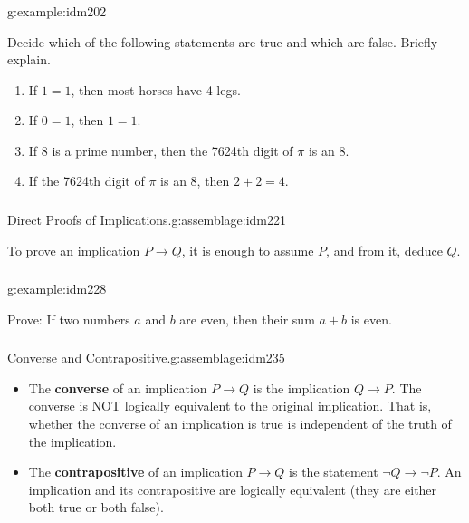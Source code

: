 \documentclass[11pt, compress]{beamer}
\newcommand{\terminology}[1]{\textbf{#1}}\newcommand{\lt}{<}
\newcommand{\imp}{\rightarrow}
\begin{document}
\begin{frame}
\frametitle{}
\begin{example}{}{g:example:idm202}%

Decide which of the following statements are true and which are false. Briefly explain.\begin{enumerate}
\item{}
If \(1=1\), then most horses have 4 legs.

\item{}
If \(0=1\), then \(1=1\).

\item{}
If 8 is a prime number, then the 7624th digit of \(\pi\) is an 8.

\item{}
If the 7624th digit of \(\pi\) is an 8, then \(2+2 = 4\).
\end{enumerate}\end{example}
\end{frame}
 
\begin{frame}
\frametitle{}
\begin{assemblage}{Direct Proofs of Implications.}{g:assemblage:idm221}%

To prove an implication \(P \imp Q\), it is enough to assume \(P\), and from it, deduce \(Q\).\end{assemblage}
\end{frame}
 
\begin{frame}
\frametitle{}
\begin{example}{}{g:example:idm228}%

Prove: If two numbers \(a\) and \(b\) are even, then their sum \(a+b\) is even.\end{example}
\end{frame}
 
\begin{frame}
\frametitle{}
\begin{assemblage}{Converse and Contrapositive.}{g:assemblage:idm235}%

\begin{itemize}
\item{}
The \terminology{converse}  of an implication \(P \imp Q\) is the implication \(Q \imp P\). The converse is NOT logically equivalent to the original implication. That is, whether the converse of an implication is true is independent of the truth of the implication.

\item{}
The \terminology{contrapositive}  of an implication \(P \imp Q\) is the statement \(\neg Q \imp \neg P\). An implication and its contrapositive are logically equivalent (they are either both true or both false).
\end{itemize}\end{assemblage}
\end{frame}
 
\end{document}

